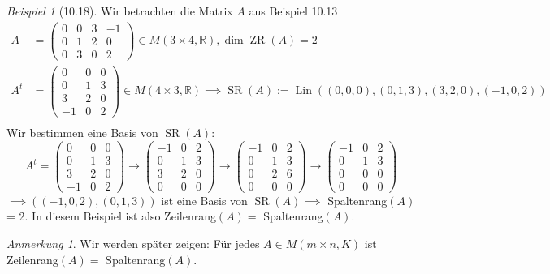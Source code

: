 \documentclass[a4paper]{scrartcl}
\DeclareMathOperator{\Lin}{Lin}
\DeclareMathOperator{\ZR}{ZR}
\DeclareMathOperator{\SR}{SR}
\theoremstyle{definition}
\theoremstyle{plain}
\theoremstyle{plain}
\theoremstyle{remark}
\theoremstyle{remark}
\newtheorem{note}{Anmerkung}
\theoremstyle{remark}
\theoremstyle{remark}
\theoremstyle{remark}
\newtheorem{ex}{Beispiel}
\begin{document}
\begin{ex}[10.18]
Wir betrachten die Matrix $A$ aus Beispiel 10.13
\begin{align*}
A &= \begin{pmatrix} 0 & 0 & 3 & -1 \\ 0 & 1 & 2 & 0 \\ 0 & 3 & 0 & 2\end{pmatrix} \in M(3\times 4, \mathbb{R}), \dim \ZR(A) = 2 \\
A^t &= \begin{pmatrix} 0 & 0 & 0 \\ 0 & 1 & 3 \\ 3 & 2 & 0 \\ -1 & 0 & 2\end{pmatrix} \in M(4\times 3, \mathbb{R}) \implies \SR(A) := \Lin((0,0,0), (0,1,3), (3,2,0), (-1,0,2)) \\
\end{align*}
Wir bestimmen eine Basis von $\SR(A)$:
\begin{equation*}
A^t = \begin{pmatrix} 0 & 0 & 0 \\ 0 & 1 & 3 \\ 3 & 2 & 0 \\ -1 & 0 & 2\end{pmatrix} \to
\begin{pmatrix} -1 & 0 & 2 \\ 0 & 1 & 3 \\ 3 & 2 & 0 \\ 0 & 0 & 0\end{pmatrix} \to
\begin{pmatrix} -1 & 0 & 2 \\ 0 & 1 & 3 \\ 0 & 2 & 6 \\ 0 & 0 & 0\end{pmatrix} \to
\begin{pmatrix} -1 & 0 & 2 \\ 0 & 1 & 3 \\ 0 & 0 & 0 \\ 0 & 0 & 0\end{pmatrix}
\end{equation*}
$\implies ((-1, 0, 2), (0, 1, 3))$ ist eine Basis von $\SR(A) \implies$ Spaltenrang$(A)$ = 2.
In diesem Beispiel ist also Zeilenrang$(A) =$ Spaltenrang$(A)$.
\end{ex}
\begin{note}
Wir werden später zeigen: Für jedes $A\in M(m\times n, K)$ ist Zeilenrang$(A) =$ Spaltenrang$(A)$.
\end{note}
\end{document}
